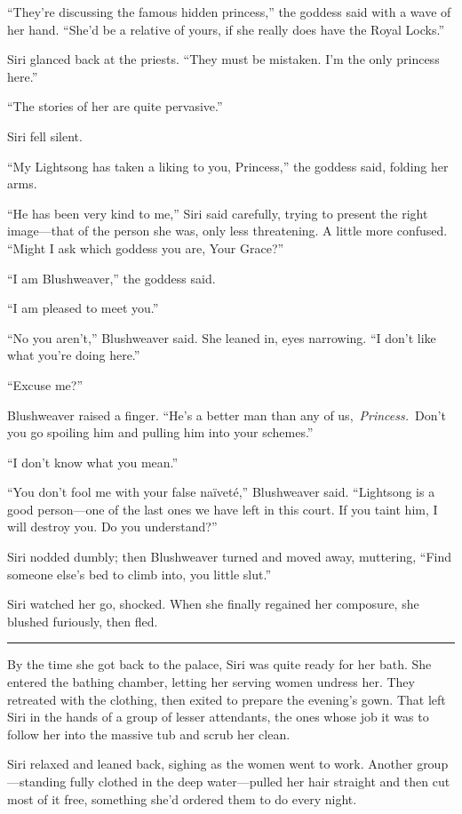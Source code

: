 “They’re discussing the famous hidden princess,” the goddess said with a wave of her hand. “She’d be a relative of yours, if she really does have the Royal Locks.”

Siri glanced back at the priests. “They must be mistaken. I’m the only princess here.”

“The stories of her are quite pervasive.”

Siri fell silent.

“My Lightsong has taken a liking to you, Princess,” the goddess said, folding her arms.

“He has been very kind to me,” Siri said carefully, trying to present the right image—that of the person she was, only less threatening. A little more confused. “Might I ask which goddess you are, Your Grace?”

“I am Blushweaver,” the goddess said.

“I am pleased to meet you.”

“No you aren’t,” Blushweaver said. She leaned in, eyes narrowing. “I don’t like what you’re doing here.”

“Excuse me?”

Blushweaver raised a finger. “He’s a better man than any of us,~\textit{Princess.}~Don’t you go spoiling him and pulling him into your schemes.”

“I don’t know what you mean.”

“You don’t fool me with your false na{\"i}vet{\'e},” Blushweaver said. “Lightsong is a good person—one of the last ones we have left in this court. If you taint him, I will destroy you. Do you understand?”

Siri nodded dumbly; then Blushweaver turned and moved away, muttering, “Find someone else’s bed to climb into, you little slut.”

Siri watched her go, shocked. When she finally regained her composure, she blushed furiously, then fled.

\bigskip \hrule \bigskip

By the time she got back to the palace, Siri was quite ready for her bath. She entered the bathing chamber, letting her serving women undress her. They retreated with the clothing, then exited to prepare the evening’s gown. That left Siri in the hands of a group of lesser attendants, the ones whose job it was to follow her into the massive tub and scrub her clean.

Siri relaxed and leaned back, sighing as the women went to work. Another group—standing fully clothed in the deep water—pulled her hair straight and then cut most of it free, something she’d ordered them to do every night.

